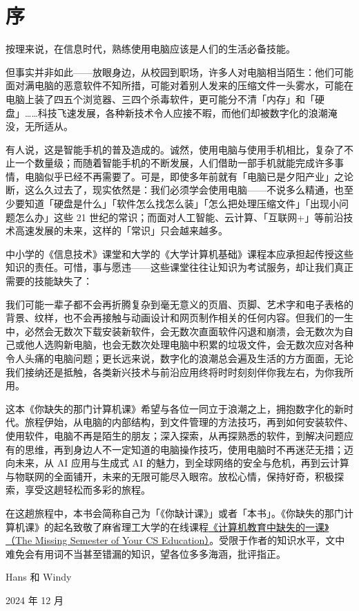 \chapter{序}
\label{premble}

按理来说，在信息时代，熟练使用电脑应该是人们的生活必备技能。

但事实并非如此——放眼身边，从校园到职场，许多人对电脑相当陌生：他们可能面对满电脑的恶意软件不知所措，可能对着别人发来的压缩文件一头雾水，可能在电脑上装了四五个浏览器、三四个杀毒软件，更可能分不清「内存」和「硬盘」……科技飞速发展，各种新技术令人应接不暇，而他们却被数字化的浪潮淹没，无所适从。

有人说，这是智能手机的普及造成的。诚然，使用电脑与使用手机相比，复杂了不止一个数量级；而随着智能手机的不断发展，人们借助一部手机就能完成许多事情，电脑似乎已经不再需要了。可是，即使多年前就有「电脑已是夕阳产业」之论断，这么久过去了，现实依然是：我们必须学会使用电脑——不说多么精通，也至少要知道「硬盘是什么」「软件怎么找怎么装」「怎么把处理压缩文件」「出现小问题怎么办」这些 21 世纪的常识；而面对人工智能、云计算、「互联网+」等前沿技术高速发展的未来，这样的「常识」只会越来越多。

中小学的《信息技术》课堂和大学的《大学计算机基础》课程本应承担起传授这些知识的责任。可惜，事与愿违——这些课堂往往让知识为考试服务，却让我们真正需要的技能缺失了：

我们可能一辈子都不会再折腾复杂到毫无意义的页眉、页脚、艺术字和电子表格的背景、纹样，也不会再接触与动画设计和网页制作相关的任何内容。但我们的一生中，必然会无数次下载安装新软件，会无数次直面软件闪退和崩溃，会无数次为自己或他人选购新电脑，也会无数次处理电脑中积累的垃圾文件，会无数次应对各种令人头痛的电脑问题；更长远来说，数字化的浪潮总会遍及生活的方方面面，无论我们接纳还是抵触，各类新兴技术与前沿应用终将时时刻刻伴你我左右，为你我所用。

这本《你缺失的那门计算机课》希望与各位一同立于浪潮之上，拥抱数字化的新时代。旅程伊始，从电脑的内部结构，到文件管理的方法技巧，再到如何安装软件、使用软件，电脑不再是陌生的朋友；深入探索，从再探熟悉的软件，到解决问题应有的思维，再到身边人不一定知道的电脑操作技巧，使用电脑时不再迷茫无措；迈向未来，从 AI 应用与生成式 AI 的魅力，到全球网络的安全与危机，再到云计算与物联网的全面铺开，未来的无限可能尽入眼帘。放松心情，保持好奇，积极探索，享受这趟轻松而多彩的旅程。

在这趟旅程中，本书会简称自己为「《你缺计课》」或者「本书」。《你缺失的那门计算机课》的起名致敬了麻省理工大学的在线课程\href{https://missing.csail.mit.edu/}{《计算机教育中缺失的一课》（The Missing Semester of Your CS Education）}。受限于作者的知识水平，文中难免会有用词不当甚至错漏的知识，望各位多多海涵，批评指正。

\hfill Hans 和 Windy

\hfill 2024 年 12 月